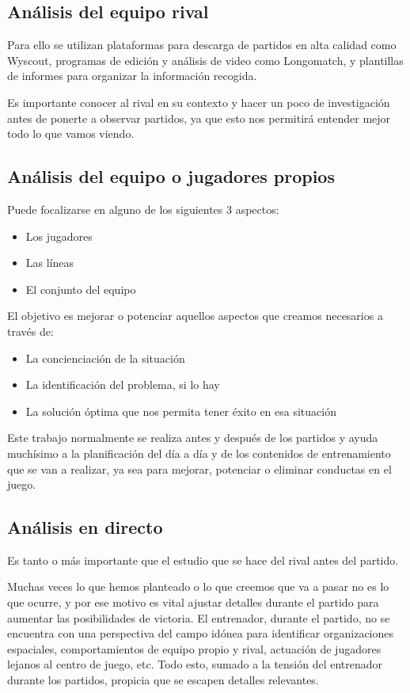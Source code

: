\subsection{Análisis del equipo rival}

Para ello se utilizan plataformas para descarga de partidos en alta 
calidad como Wyscout, programas de edición y análisis de video como 
Longomatch, y plantillas de informes para organizar la información recogida.

Es importante conocer al rival en su contexto y hacer un poco de investigación antes 
de ponerte a observar partidos, ya que esto nos permitirá entender 
mejor todo lo que vamos viendo.

\subsection{Análisis del equipo o jugadores propios}
Puede focalizarse en alguno de los siguientes 3 aspectos:

\begin{itemize}
    \item Los jugadores
    \item Las líneas
    \item El conjunto del equipo
\end{itemize}

El objetivo es mejorar o potenciar aquellos aspectos que creamos necesarios 
a través de:

\begin{itemize}
    \item La concienciación de la situación
    \item La identificación del problema, si lo hay
    \item La solución óptima que nos permita tener éxito en esa situación
\end{itemize}

Este trabajo normalmente se realiza antes y después de los partidos y 
ayuda muchísimo a la planificación del día a día y de los contenidos 
de entrenamiento que se van a realizar, ya sea para mejorar, potenciar 
o eliminar conductas en el juego.

\subsection{Análisis en directo}
Es tanto o más importante que el estudio que se hace del rival antes 
del partido.

Muchas veces lo que hemos planteado o lo que creemos que va a pasar no 
es lo que ocurre, y por ese motivo es vital ajustar detalles durante 
el partido para aumentar las posibilidades de victoria. El entrenador, 
durante el partido, no se encuentra con una perspectiva del campo 
idónea para identificar organizaciones espaciales, comportamientos 
de equipo propio y rival, actuación de jugadores lejanos al centro 
de juego, etc. Todo esto, sumado a la tensión del entrenador durante 
los partidos, propicia que se escapen detalles relevantes.

